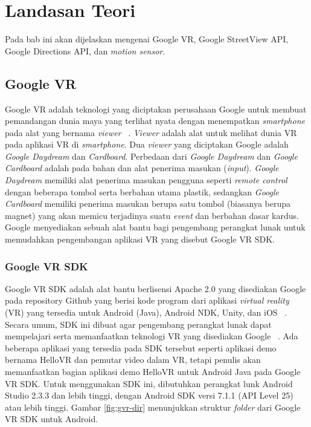\chapter{Landasan Teori}
\label{chap:teori}
Pada bab ini akan dijelaskan mengenai Google VR, Google StreetView API, Google Directions API, dan \textit{motion sensor}.

\section{Google VR}
\label{sec:google-vr} 
Google VR adalah teknologi yang diciptakan perusahaan Google untuk membuat pemandangan dunia maya yang terlihat nyata dengan menempatkan \textit{smartphone} pada alat yang bernama \textit{viewer} ~\cite{quickstart-google-vr}. \textit{Viewer} adalah alat untuk melihat dunia VR pada aplikasi VR di \textit{smartphone}. Dua \textit{viewer} yang diciptakan Google adalah \textit{Google Daydream} dan \textit{Cardboard}. Perbedaan dari \textit
{Google Daydream} dan \textit{Google Cardboard} adalah pada bahan dan alat penerima masukan (\textit{input}). \textit{Google Daydream} memiliki alat penerima masukan pengguna seperti \textit{remote control} dengan beberapa tombol serta berbahan utama plastik, sedangkan \textit{Google Cardboard} memiliki penerima masukan berupa satu tombol (biasanya berupa magnet) yang akan memicu terjadinya suatu \textit{event} dan berbahan dasar kardus. Google menyediakan sebuah alat bantu bagi pengembang perangkat lunak untuk memudahkan pengembangan aplikasi VR yang disebut Google VR SDK.

\subsection{Google VR SDK}
Google VR SDK adalah alat bantu berlisensi Apache 2.0 yang disediakan Google pada repository Github yang berisi kode program dari aplikasi {\it virtual reality} (VR)  yang tersedia untuk Android (Java), Android NDK, Unity, dan iOS ~\cite{all-google-vr}. Secara umum, SDK ini dibuat agar pengembang perangkat lunak dapat mempelajari serta memanfaatkan teknologi VR yang disediakan Google ~\cite{quickstart-google-vr}. Ada beberapa aplikasi yang tersedia pada SDK tersebut seperti aplikasi demo bernama HelloVR dan pemutar video dalam VR, tetapi penulis akan memanfaatkan bagian aplikasi demo HelloVR untuk Android Java pada Google VR SDK. Untuk menggunakan SDK ini, dibutuhkan perangkat lunk Android Studio 2.3.3 dan lebih tinggi, dengan Android SDK versi 7.1.1 (API Level 25) atau lebih tinggi. Gambar \ref{fig:gvr-dir} menunjukkan struktur \textit{folder} dari Google VR SDK untuk Android.

